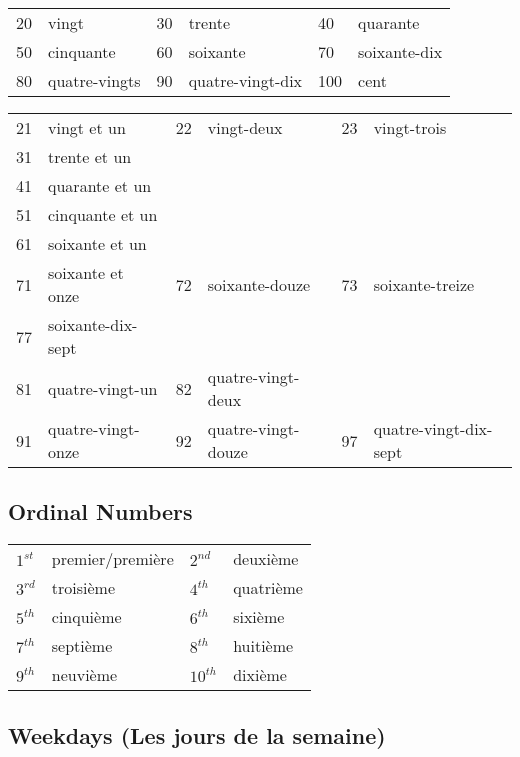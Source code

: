 \begin{tabular}{| l | l | l | l | l | l |}
\hline
20  & vingt         & 30  & trente          & 40  & quarante\\
50  & cinquante     & 60  & soixante        & 70  & soixante-dix\\
80  & quatre-vingts & 90  & quatre-vingt-dix& 100 & cent\\
\hline
\end{tabular}

\begin{tabular}{| l | l | l | l | l | l |}
21 & vingt et un    & 22 & vingt-deux       & 23 & vingt-trois \\
31 & trente et un &&&&\\
41 & quarante et un &&&&\\
51 & cinquante et un &&&&\\
61 & soixante et un &&&&\\
71 & soixante et onze & 72 & soixante-douze & 73 & soixante-treize\\
77 & soixante-dix-sept &&&&\\
81 & quatre-vingt-un& 82 & quatre-vingt-deux & & \\
91 & quatre-vingt-onze & 92 & quatre-vingt-douze & 97 & quatre-vingt-dix-sept\\
\end{tabular}

\subsection{Ordinal Numbers}
\begin{tabular}{| l | l | l | l |}
\hline
$1^{st}$  & premier/premi\`ere  & $2^{nd}$   & deuxi\`eme   \\
$3^{rd}$  & troisi\`eme         & $4^{th}$   & quatri\`eme  \\
$5^{th}$  & cinqui\`eme         & $6^{th}$   & sixi\`eme    \\
$7^{th}$  & septi\`eme          & $8^{th}$   & huiti\`eme   \\
$9^{th}$  & neuvi\`eme          & $10^{th}$  & dixi\`eme    \\
\hline
\end{tabular}

\subsection{Weekdays (Les jours de la semaine)}

